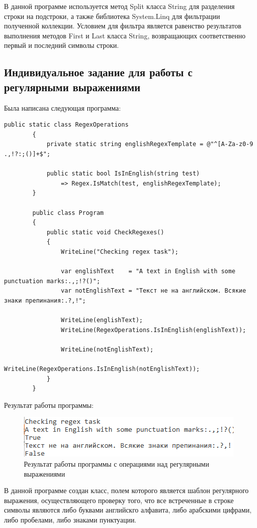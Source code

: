 \documentclass[a4paper,14pt]{extarticle}
\begin{document}
    В данной программе используется метод Split класса String для разделения
    строки на подстроки, а также библиотека System.Linq для фильтрации 
    полученной коллекции. Условием для фильтра является равенство результатов
    выполнения методов First и Last класса String, возвращающих соответственно
    первый и последний символы строки.

    \subsection{Индивидуальное задание для работы с регулярными выражениями}

    Была написана следующая программа:

    \begin{lstlisting}[language={[Sharp]C}]
        public static class RegexOperations
        {
            private static string englishRegexTemplate = @"^[A-Za-z0-9 .,!?:;()]+$";

            public static bool IsInEnglish(string test)
                => Regex.IsMatch(test, englishRegexTemplate);
        }

        public class Program
        {
            public static void CheckRegexes()
            {
                WriteLine("Checking regex task");

                var englishText    = "A text in English with some punctuation marks:.,;!?()";
                var notEnglishText = "Текст не на английском. Всякие знаки препинания:.?,!";

                WriteLine(englishText);
                WriteLine(RegexOperations.IsInEnglish(englishText));

                WriteLine(notEnglishText);
                WriteLine(RegexOperations.IsInEnglish(notEnglishText));
            }
        }
    \end{lstlisting}

    Результат работы программы:

    \begin{figure}[H]
        \centering
        \includegraphics[width=.4\textwidth]{Regexes}
        \caption{Результат работы программы с операциями над регулярными выражениями}
    \end{figure}

    В данной программе создан класс, полем которого является шаблон регулярного
    выражения, осуществляющего проверку того, что все встреченные в строке символы
    являются либо буквами английскго алфавита, либо арабскими цифрами, либо пробелами,
    либо знаками пунктуации. 
\end{document}
